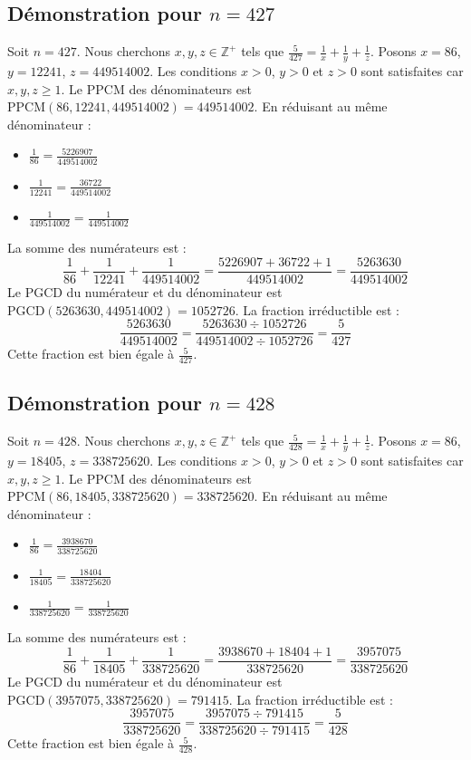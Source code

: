 \documentclass[11pt,a4paper]{article}
\begin{document}
\subsection{Démonstration pour $n = 427$}
Soit $n = 427$. Nous cherchons $x, y, z \in \mathbb{Z}^{+}$ tels que $\frac{5}{427} = \frac{1}{x} + \frac{1}{y} + \frac{1}{z}$.
Posons $x = 86$, $y = 12241$, $z = 449514002$.
Les conditions $x > 0$, $y > 0$ et $z > 0$ sont satisfaites car $x, y, z \geq 1$.
Le PPCM des dénominateurs est $\text{PPCM}(86, 12241, 449514002) = 449514002$.
En réduisant au même dénominateur :
\begin{itemize}
    \item $\frac{1}{86} = \frac{5226907}{449514002}$
    \item $\frac{1}{12241} = \frac{36722}{449514002}$
    \item $\frac{1}{449514002} = \frac{1}{449514002}$
\end{itemize}
La somme des numérateurs est :
$$ \frac{1}{86} + \frac{1}{12241} + \frac{1}{449514002} = \frac{5226907 + 36722 + 1}{449514002} = \frac{5263630}{449514002} $$
Le PGCD du numérateur et du dénominateur est $\text{PGCD}(5263630, 449514002) = 1052726$.
La fraction irréductible est :
$$ \frac{5263630}{449514002} = \frac{5263630 \div 1052726}{449514002 \div 1052726} = \frac{5}{427} $$
Cette fraction est bien égale à $\frac{5}{427}$.

\subsection{Démonstration pour $n = 428$}
Soit $n = 428$. Nous cherchons $x, y, z \in \mathbb{Z}^{+}$ tels que $\frac{5}{428} = \frac{1}{x} + \frac{1}{y} + \frac{1}{z}$.
Posons $x = 86$, $y = 18405$, $z = 338725620$.
Les conditions $x > 0$, $y > 0$ et $z > 0$ sont satisfaites car $x, y, z \geq 1$.
Le PPCM des dénominateurs est $\text{PPCM}(86, 18405, 338725620) = 338725620$.
En réduisant au même dénominateur :
\begin{itemize}
    \item $\frac{1}{86} = \frac{3938670}{338725620}$
    \item $\frac{1}{18405} = \frac{18404}{338725620}$
    \item $\frac{1}{338725620} = \frac{1}{338725620}$
\end{itemize}
La somme des numérateurs est :
$$ \frac{1}{86} + \frac{1}{18405} + \frac{1}{338725620} = \frac{3938670 + 18404 + 1}{338725620} = \frac{3957075}{338725620} $$
Le PGCD du numérateur et du dénominateur est $\text{PGCD}(3957075, 338725620) = 791415$.
La fraction irréductible est :
$$ \frac{3957075}{338725620} = \frac{3957075 \div 791415}{338725620 \div 791415} = \frac{5}{428} $$
Cette fraction est bien égale à $\frac{5}{428}$.
\end{document}
